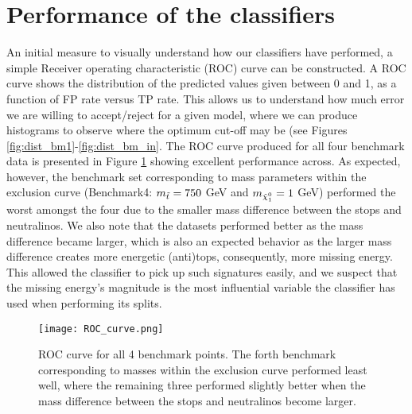 
\section{Performance of the classifiers}
An initial measure to visually understand how our classifiers have performed, a simple Receiver operating characteristic (ROC) curve can be constructed. A ROC curve shows the distribution of the predicted values given between 0 and 1, as a function of FP rate versus TP rate. This allows us to understand how much error we are willing to accept/reject for a given model, where we can produce histograms to observe where the optimum cut-off may be (see Figures \ref{fig:dist_bm1}-\ref{fig:dist_bm_in}. The ROC curve produced for all four benchmark data is presented in Figure \ref{fig:ROC} showing excellent performance across. As expected, however, the benchmark set corresponding to mass parameters within the exclusion curve (Benchmark4: $m_{\Tilde{t}} = 750$ GeV and $m_{\Tilde{\chi}_1^0} = 1$ GeV) performed the worst amongst the four due to the smaller mass difference between the stops and neutralinos. We also note that the datasets performed better as the mass difference became larger, which is also an expected behavior as the larger mass difference creates more energetic (anti)tops, consequently, more missing energy. This allowed the classifier to pick up such signatures easily, and we suspect that the missing energy's magnitude is the most influential variable the classifier has used when performing its splits. \\


\begin{figure}[htbp]
    \centering
    \texttt{[image: ROC\_curve.png]}
    \caption{ROC curve for all 4 benchmark points. The forth benchmark corresponding to masses within the exclusion curve performed least well, where the remaining three performed slightly better when the mass difference between the stops and neutralinos become larger.}
    \label{fig:ROC}
\end{figure} 

